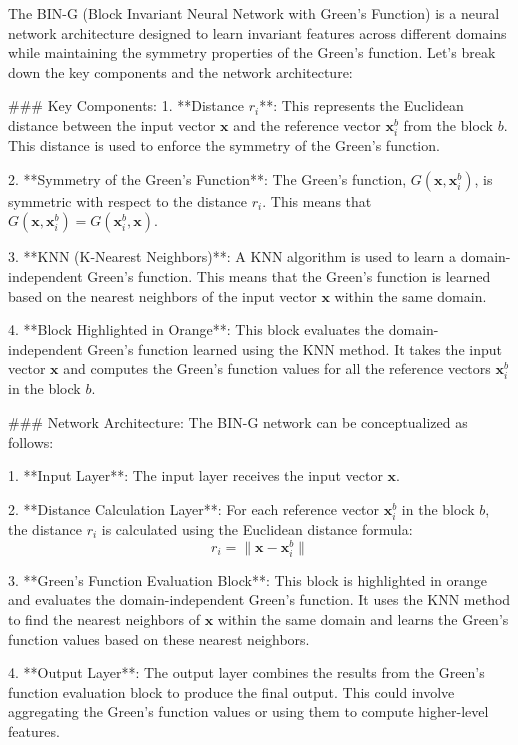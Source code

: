 The BIN-G (Block Invariant Neural Network with Green's Function) is a neural network architecture designed to learn invariant features across different domains while maintaining the symmetry properties of the Green's function. Let's break down the key components and the network architecture:

### Key Components:
1. **Distance \( r_i \)**: This represents the Euclidean distance between the input vector \(\mathbf{x}\) and the reference vector \(\mathbf{x}_i^b\) from the block \(b\). This distance is used to enforce the symmetry of the Green's function.

2. **Symmetry of the Green's Function**: The Green's function, \(G(\mathbf{x}, \mathbf{x}_i^b)\), is symmetric with respect to the distance \(r_i\). This means that \(G(\mathbf{x}, \mathbf{x}_i^b) = G(\mathbf{x}_i^b, \mathbf{x})\).

3. **KNN (K-Nearest Neighbors)**: A KNN algorithm is used to learn a domain-independent Green's function. This means that the Green's function is learned based on the nearest neighbors of the input vector \(\mathbf{x}\) within the same domain.

4. **Block Highlighted in Orange**: This block evaluates the domain-independent Green's function learned using the KNN method. It takes the input vector \(\mathbf{x}\) and computes the Green's function values for all the reference vectors \(\mathbf{x}_i^b\) in the block \(b\).

### Network Architecture:
The BIN-G network can be conceptualized as follows:

1. **Input Layer**: The input layer receives the input vector \(\mathbf{x}\).

2. **Distance Calculation Layer**: For each reference vector \(\mathbf{x}_i^b\) in the block \(b\), the distance \(r_i\) is calculated using the Euclidean distance formula:
   \[
   r_i = \|\mathbf{x} - \mathbf{x}_i^b\|
   \]

3. **Green's Function Evaluation Block**: This block is highlighted in orange and evaluates the domain-independent Green's function. It uses the KNN method to find the nearest neighbors of \(\mathbf{x}\) within the same domain and learns the Green's function values based on these nearest neighbors.

4. **Output Layer**: The output layer combines the results from the Green's function evaluation block to produce the final output. This could involve aggregating the Green's function values or using them to compute higher-level features.

